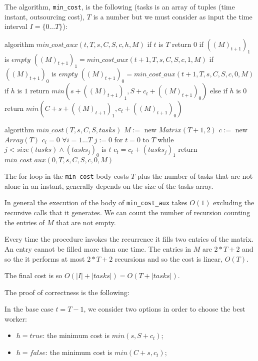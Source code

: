 \documentclass[paper=a4, fontsize=11pt]{scrartcl} %
\numberwithin{equation}{section} %
\numberwithin{figure}{section} %
\numberwithin{table}{section} %
\begin{document}
The algorithm, \verb|min_cost|, is the following (tasks is an array of tuples (time instant, outsourcing cost), $T$ is a number but we must consider as input the time interval $I = \{0 ... T\}$):

\begin{pseudo}
algorithm $min\_cost\_aux(t, T, s, C, S, c, h, M)$
    if $t$ is $T$
        return $0$
    if $((M)_{t+1})_1$ is $empty$
         $((M)_{t+1})_1 = min\_cost\_aux(t+1, T, s, C, S, c, 1, M)$
    if $((M)_{t+1})_0$ is $empty$
         $((M)_{t+1})_0 = min\_cost\_aux(t+1, T, s, C, S, c, 0, M)$
    if $h$ is $1$
        return $min(s + ((M)_{t+1})_1, S + c_t + ((M)_{t+1})_0)$
    else if $h$ is $0$
        return $min(C + s + ((M)_{t+1})_1, c_t + ((M)_{t+1})_0)$
\end{pseudo}
\begin{pseudo}
algorithm $min\_cost(T, s, C, S, tasks)$
    $M :=$ new $Matrix(T+1, 2)$
    $c :=$ new $Array(T)$
    $c_i = 0$ $\forall i = 1 ... T$
    $j := 0$
    for $t = 0$ to $T$
        while $j < size(tasks) \land (tasks_j)_0$ is $t$
            $c_t = c_t + (tasks_j)_1$
    return $min\_cost\_aux(0, T, s, C, S, c, 0, M)$
\end{pseudo}

The for loop in the \verb|min_cost| body costs $T$ plus the number of tasks that are not alone in an instant, generally depends on the size of the tasks array.

In general the execution of the body of \verb|min_cost_aux| takes $O(1)$ excluding the recursive calls that it generates. We can count the number of recursion counting the entries of $M$ that are not empty.

Every time the procedure invokes the recurrence it fills two entries of the matrix. An entry cannot be filled more than one time. The entries in $M$ are $2*T+2$ and so the it performs at most $2*T+2$ recursions and so the cost is linear, $O(T)$.

The final cost is so $O(|I| + |tasks|) = O(T + |tasks|)$.

The proof of correctness is the following:

In the base case $t = T-1$, we consider two options in order to choose the best worker:
\begin{itemize}
    \item $h = true$: the minimum cost is $min(s, S + c_t)$;
    \item $h = false$: the minimum cost is $min(C + s, c_t)$;
\end{itemize}
\end{document}
